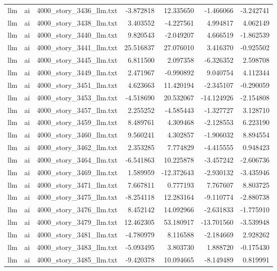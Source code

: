 \begin{longtable}{lllrrrr}
llm & ai & 4000\_story\_3436\_llm.txt & -3.872818 & 12.335650 & -1.466066 & -3.242741 \\
llm & ai & 4000\_story\_3438\_llm.txt & 3.403552 & -4.227561 & 4.994817 & 4.062149 \\
llm & ai & 4000\_story\_3440\_llm.txt & 9.820543 & -2.049207 & 4.666519 & -1.862539 \\
llm & ai & 4000\_story\_3441\_llm.txt & 25.516837 & 27.076010 & 3.416370 & -0.925502 \\
llm & ai & 4000\_story\_3445\_llm.txt & 6.811500 & 2.097358 & -6.326352 & 2.598708 \\
llm & ai & 4000\_story\_3449\_llm.txt & 2.471967 & -0.990892 & 9.040754 & 4.112344 \\
llm & ai & 4000\_story\_3451\_llm.txt & 4.623663 & 11.420194 & -2.345107 & -0.290059 \\
llm & ai & 4000\_story\_3453\_llm.txt & -4.518690 & 20.532067 & -14.124926 & -2.154808 \\
llm & ai & 4000\_story\_3457\_llm.txt & 2.255252 & -4.585443 & -1.327727 & 3.128710 \\
llm & ai & 4000\_story\_3459\_llm.txt & 8.489761 & 4.309468 & -2.128553 & 6.223190 \\
llm & ai & 4000\_story\_3460\_llm.txt & 9.560241 & 4.302857 & -1.906032 & 8.894554 \\
llm & ai & 4000\_story\_3462\_llm.txt & 2.353285 & 7.774829 & -4.415555 & 0.948423 \\
llm & ai & 4000\_story\_3464\_llm.txt & -6.541863 & 10.225878 & -3.457242 & -2.606736 \\
llm & ai & 4000\_story\_3469\_llm.txt & 1.589959 & -12.372643 & -2.930132 & -3.435946 \\
llm & ai & 4000\_story\_3471\_llm.txt & 7.667811 & 0.777193 & 7.767607 & 8.803725 \\
llm & ai & 4000\_story\_3475\_llm.txt & -8.254118 & 12.283164 & -9.110774 & -2.880738 \\
llm & ai & 4000\_story\_3476\_llm.txt & 8.452142 & 14.092966 & -2.631833 & -1.775910 \\
llm & ai & 4000\_story\_3479\_llm.txt & 12.462305 & 53.180917 & -13.701560 & -3.539948 \\
llm & ai & 4000\_story\_3481\_llm.txt & -4.780979 & 8.116588 & -2.184669 & 2.928262 \\
llm & ai & 4000\_story\_3483\_llm.txt & -5.093495 & 3.803730 & 1.888720 & -0.175430 \\
llm & ai & 4000\_story\_3485\_llm.txt & -9.420378 & 10.094665 & -8.149489 & 0.819991 \\

\end{longtable}
